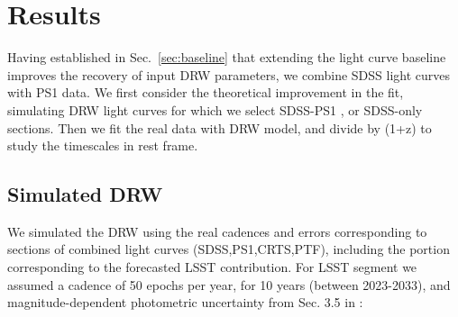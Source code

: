 \documentclass[twocolumn]{aastex62}
\begin{document}




\section{Results}

Having established in Sec.~\ref{sec:baseline} that extending the light curve baseline improves the recovery of input DRW parameters,  we combine SDSS light curves with PS1 data. We first consider the theoretical improvement in the fit, simulating DRW light curves for which we select SDSS-PS1 , or SDSS-only sections.  Then we fit the real data with DRW model, and divide by (1+z) to study the timescales in rest frame. 


\subsection{Simulated DRW}

We simulated the DRW using the real cadences and errors corresponding to sections of combined light curves (SDSS,PS1,CRTS,PTF), including the portion corresponding to the forecasted LSST contribution.  For LSST segment we assumed a cadence of 50 epochs per year,  for 10 years (between 2023-2033), and  magnitude-dependent photometric uncertainty from Sec. 3.5 in \citet{lsstscibook}:
\end{document}
